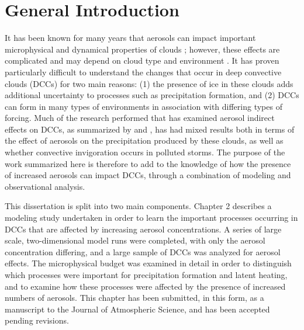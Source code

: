 \section{General Introduction}

It has been known for many years that aerosols can impact important microphysical and dynamical properties of clouds  \citep{Twomey:1977p42,Albrecht:1989p347}; however, these effects are complicated and may depend on cloud type \citep{Seifert:2006p86,VanDenHeever:2011p7996}  and environment \citep{Khain:2008p35,Lebsock:2008p45,Fan:2009p7470,Storer:2010p8001}.  It has proven particularly difficult to understand the changes that occur in deep convective clouds (DCCs) for two main reasons: (1) the presence of ice in these clouds adds additional uncertainty to processes such as precipitation formation, and (2) DCCs can form in many types of environments in association with differing types of forcing.  Much of the research performed that has examined aerosol indirect effects on DCCs, as summarized by \citet{Khain:2009p18} and \citet{taoreview}, has had mixed results both in terms of the effect of aerosols on the precipitation produced by these clouds, as well as whether convective invigoration occurs in polluted storms.  The purpose of the work summarized here is therefore to add to the knowledge of how the presence of increased aerosols can impact DCCs, through a combination of modeling and observational analysis.

This dissertation is split into two main components.  Chapter 2 describes a modeling study undertaken in order to learn the important processes occurring in DCCs that are affected by increasing aerosol concentrations.  A series of large scale, two-dimensional model runs were completed, with only the aerosol concentration differing, and a large sample of DCCs was analyzed for aerosol effects.  The microphysical budget was examined in detail in order to distinguish which processes were important for precipitation formation and latent heating, and to examine how these processes were affected by the presence of increased numbers of aerosols.  This chapter has been submitted, in this form, as a manuscript to the Journal of Atmospheric Science, and has been accepted pending revisions.


